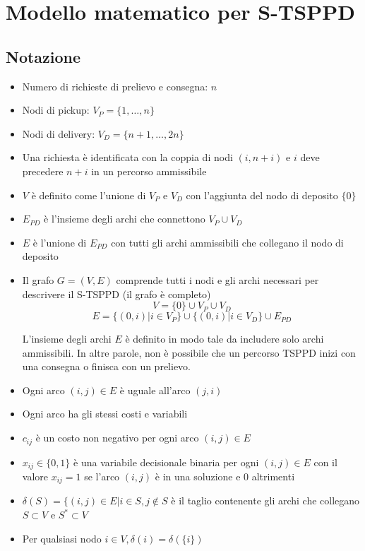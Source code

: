 \documentclass[9pt]{beamer}
\begin{document}
\section{Modello matematico per S-TSPPD}
\subsection{Notazione}
\begin{frame}[allowframebreaks]{\subsecname}
	\begin{itemize}
		\item
		Numero di richieste di prelievo e consegna: $n$
		
		\item
		Nodi di pickup: $V_P = \{1, \dots, n\}$
		
		\item
		Nodi di delivery: $V_D = \{n+1, \dots, 2n\}$
		
		\item
		Una richiesta è identificata con la coppia di nodi $(i,n+i)$ e $i$ deve precedere $n+i$ in un percorso ammissibile
		
		\item
		$V$ è definito come l'unione di $V_P$ e $V_D$ con l'aggiunta del nodo di deposito $\{0\}$
		
		\item
		$E_{PD}$ è l'insieme degli archi che connettono $V_P \cup V_D$
	
		\item
		$E$ è l'unione di $E_{PD}$ con tutti gli archi ammissibili che collegano il nodo di deposito
		
		\item
		Il grafo $G=(V,E)$ comprende tutti i nodi e gli archi necessari per descrivere il S-TSPPD (il grafo è completo)
		\[ V=\{0\} \cup V_P \cup V_D \]
		\[ E = \{ (0,i) | i \in V_P \} \cup \{ (0,i) | i \in V_D \} \cup E_{PD} \]
		
		L'insieme degli archi $E$ è definito in modo tale da includere solo archi ammissibili.
		In altre parole, non è possibile che un percorso TSPPD inizi con una consegna o finisca con un prelievo.
		
		\item
		Ogni arco $(i,j) \in E$ è uguale all'arco $(j, i)$

		\item
		Ogni arco ha gli stessi costi e variabili

		\item
		$c_{ij}$ è un costo non negativo per ogni arco $(i,j) \in E$

		\item
		$x_{ij} \in \{ 0, 1 \}$ è una variabile decisionale binaria per ogni $(i, j) \in E$ con il valore $x_{ij} = 1$ se l'arco $(i, j)$ è in una soluzione e $0$ altrimenti

		\item
		$\delta(S) = \{ (i, j) \in E | i \in S, j \notin S$ è il taglio contenente gli archi che collegano $S \subset V$ e $S^* \subset V$ 

		\item
		Per qualsiasi nodo $i \in V, \delta(i) = \delta( \{ i \})$
	\end{itemize}
\end{frame}
\end{document}
